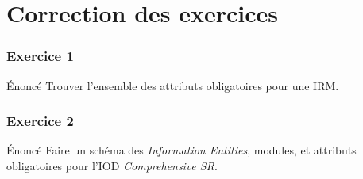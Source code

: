 \section{Correction des exercices}

\frame
{
    \frametitle{Exercice 1}
	\begin{block}{\'Enonc\'e}
		Trouver l'ensemble des attributs obligatoires pour une IRM.
	\end{block}
}

\frame
{
    \frametitle{Exercice 2}
	\begin{block}{\'Enonc\'e}
		Faire un sch\'ema des \emph{Information Entities}, modules, et attributs obligatoires pour l'IOD \emph{Comprehensive SR}.
	\end{block}

}

%
%
%
%
